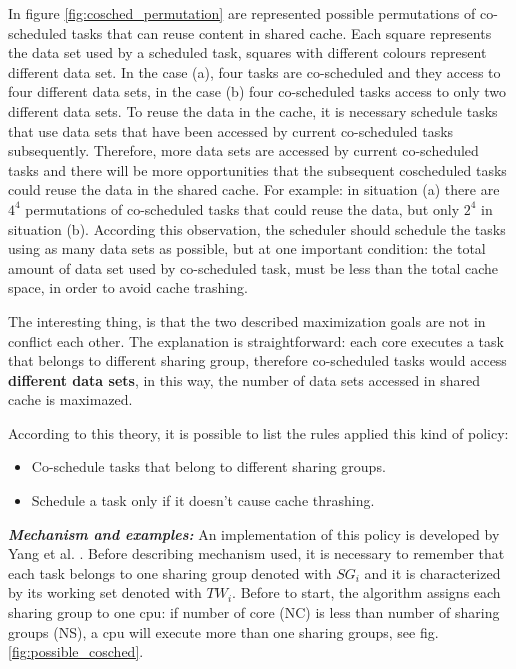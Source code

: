 \begin{description}
In figure \ref{fig:cosched_permutation} are represented possible permutations of co-scheduled tasks that can reuse content in shared cache. 
Each square represents the data set used by a scheduled task, squares with different colours represent different data set. In the case (a), four tasks are 
co-scheduled and they access to four different data sets, in the case (b) four co-scheduled tasks access to only two different data sets. To reuse the 
data in the cache, it is necessary schedule tasks that use data sets that have been accessed by current co-scheduled tasks subsequently. Therefore, more 
data sets are accessed by current co-scheduled tasks and there will be more opportunities that the subsequent coscheduled tasks could reuse the data in the
shared cache. For example: in situation (a) there are $4^4$ permutations of co-scheduled tasks that could reuse the data, but only $2^4$ in situation (b). 
According this observation, the scheduler should schedule the tasks using as many data sets as possible, but at one important condition: the total amount 
of data set used by co-scheduled task, must be less than the total cache space, in order to avoid cache trashing.

The interesting thing, is that the two described maximization goals are not in conflict each other. The explanation is straightforward: each core executes 
a task that belongs to different sharing group, therefore co-scheduled tasks would access \textbf{different data sets}, in this way, the number of data sets 
accessed in shared cache is maximazed.

According to this theory, it is possible to list the rules applied this kind of policy:

\begin{itemize}
	\item Co-schedule tasks that belong to different sharing groups. 
	\item Schedule a task only if it doesn't cause cache thrashing.
\end{itemize}

\textit{\textbf{Mechanism and examples:}} An implementation of this policy is developed by Yang et al. \cite{taiwan}. Before describing mechanism used, it is
necessary to remember that each task belongs to one sharing group denoted with $SG_i$ and it is characterized by its working set denoted with $TW_i$.
Before to start, the algorithm assigns each sharing group to one cpu: if number of core (NC) is less than number of sharing groups (NS), a cpu will execute 
more than one sharing groups, see fig. \ref{fig:possible_cosched}.


\end{description}
